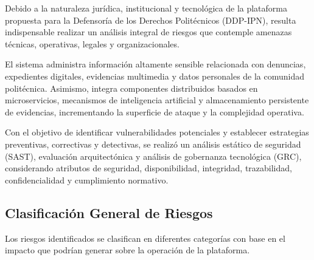 \documentclass[12pt,oneside,letterpaper]{book}
\begin{document}
Debido a la naturaleza jurídica, institucional y tecnológica de la plataforma propuesta para la Defensoría de los Derechos Politécnicos (DDP-IPN), resulta indispensable realizar un análisis integral de riesgos que contemple amenazas técnicas, operativas, legales y organizacionales.

El sistema administra información altamente sensible relacionada con denuncias, expedientes digitales, evidencias multimedia y datos personales de la comunidad politécnica. Asimismo, integra componentes distribuidos basados en microservicios, mecanismos de inteligencia artificial y almacenamiento persistente de evidencias, incrementando la superficie de ataque y la complejidad operativa.

Con el objetivo de identificar vulnerabilidades potenciales y establecer estrategias preventivas, correctivas y detectivas, se realizó un análisis estático de seguridad (SAST), evaluación arquitectónica y análisis de gobernanza tecnológica (GRC), considerando atributos de seguridad, disponibilidad, integridad, trazabilidad, confidencialidad y cumplimiento normativo.

\subsection{Clasificación General de Riesgos}

Los riesgos identificados se clasifican en diferentes categorías con base en el impacto que podrían generar sobre la operación de la plataforma.
\end{document}
